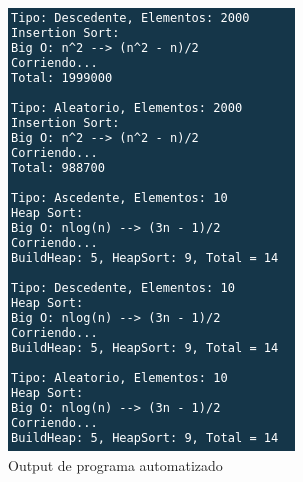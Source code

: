 \documentclass{article}
\begin{document}
\begin{figure}[H]
\begin{multicols}{2}
					\includegraphics[width = \linewidth]{images/e3-6}\par
				\end{multicols}
				\caption{Output de programa automatizado}
			\end{figure}
		
\end{document}
